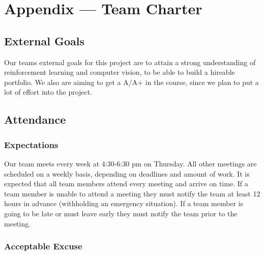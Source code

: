 \documentclass{article}
\begin{document}
\section*{Appendix --- Team Charter}


\subsection*{External Goals}


\raggedright
Our teams external goals for this project are to attain a strong understanding
of reinforcement learning and computer vision, to be able to build a hireable portfolio. 
We also are aiming to get a A/A+ in the course, since we plan to put a lot of effort into the
project.

\subsection*{Attendance}

\subsubsection*{Expectations}


\raggedright
Our team meets every week at 4:30-6:30 pm on Thursday. All other meetings are 
scheduled on a weekly basis, depending on deadlines and amount of work. It is expected that all
team members attend every meeting and arrive on time. If a team member is unable
to attend a meeting they must notify the team at least 12 hours in advance (withholding an emergency situation). If a 
team member is going to be late or must leave early they must notify the team prior
to the meeting. 

\subsubsection*{Acceptable Excuse}

\end{document}

